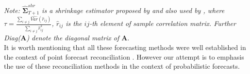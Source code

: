 \documentclass[a4paper, 11pt]{article}
\begin{document}
\begin{center}
	
	
\end{center}
\textit{Note: $\hat{\mathbold{\Sigma}}_{T+1}^{shr}$ is a shrinkage estimator proposed by \citet{Schafer2005} and also used by \citet{Wickramasuriya2017}, where $\tau = \frac{\sum_{i \ne j}\hat{Var}(\hat{r}_{ij})}{\sum_{i \ne j}\hat{r}_{ij}^2}$, $\hat{r}_{ij}$ is the $ij$-th element of sample correlation matrix. Further Diag($\bm{A}$) denote the diagonal matrix of $\bm{A}$}.\\

\noindent
It is worth mentioning that all these forecasting methods were well established in the context of point forecast reconciliation \citep{Hyndman2011, Wickramasuriya2017, Hyndman2016}. However our attempt is to emphasis the use of these reconciliation methods in the context of probabilistic forecasts. \\
\end{document}
